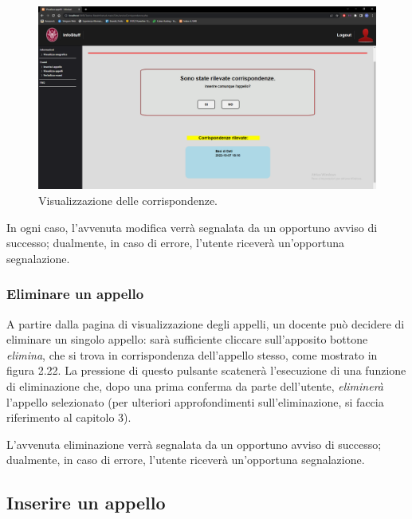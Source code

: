 \documentclass [a4paper,11pt]{book}
\begin{document}
\begin{figure}
\centering
\includegraphics[scale=0.3]{figura2-24.png}
\caption{Visualizzazione delle corrispondenze.}
\end{figure}

In ogni caso, l'avvenuta modifica verrà segnalata da un opportuno avviso di successo; dualmente, in caso di errore, l'utente riceverà un'opportuna segnalazione.

\medskip

\subsubsection{Eliminare un appello}

A partire dalla pagina di visualizzazione degli appelli, un docente può decidere di eliminare un singolo appello: sarà sufficiente cliccare sull'apposito bottone \emph{elimina}, che si trova in corrispondenza dell'appello stesso, come mostrato in figura 2.22. La pressione di questo pulsante scatenerà l'esecuzione di una funzione di eliminazione che, dopo una prima conferma da parte dell'utente, \emph{eliminerà} l'appello selezionato (per ulteriori approfondimenti sull'eliminazione, si faccia riferimento al capitolo 3).

L'avvenuta eliminazione verrà segnalata da un opportuno avviso di successo; dualmente, in caso di errore, l'utente riceverà un'opportuna segnalazione.

\medskip

\subsection{Inserire un appello}
\end{document}
